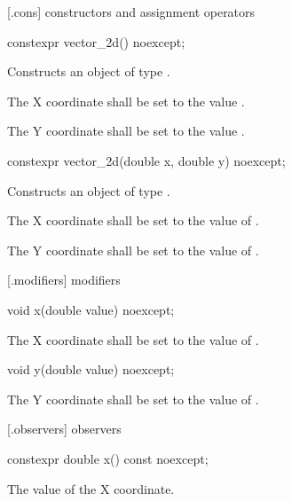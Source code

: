  [\vectortwod.cons] { constructors and assignment operators}

\begin{itemdecl}
constexpr vector_2d() noexcept;
\end{itemdecl}
\begin{itemdescr}
\pnum
\effects
Constructs an object of type .

\pnum
The X coordinate shall be set to the value .

\pnum
The Y coordinate shall be set to the value .
\end{itemdescr}

\begin{itemdecl}
constexpr vector_2d(double x, double y) noexcept;
\end{itemdecl}
\begin{itemdescr}
\pnum
\effects
Constructs an object of type .

\pnum
The X coordinate shall be set to the value of .

\pnum
The Y coordinate shall be set to the value of .
\end{itemdescr}

 [\vectortwod.modifiers]{ modifiers}

\begin{itemdecl}
void x(double value) noexcept;
\end{itemdecl}
\begin{itemdescr}
\pnum
\effects
The X coordinate shall be set to the value of .
\end{itemdescr}

\begin{itemdecl}
void y(double value) noexcept;
\end{itemdecl}
\begin{itemdescr}
\pnum
\effects
The Y coordinate shall be set to the value of .
\end{itemdescr}

 [\vectortwod.observers]{ observers}

\begin{itemdecl}
constexpr double x() const noexcept;
\end{itemdecl}
\begin{itemdescr}
\pnum
\returns
The value of the X coordinate.
\end{itemdescr}

